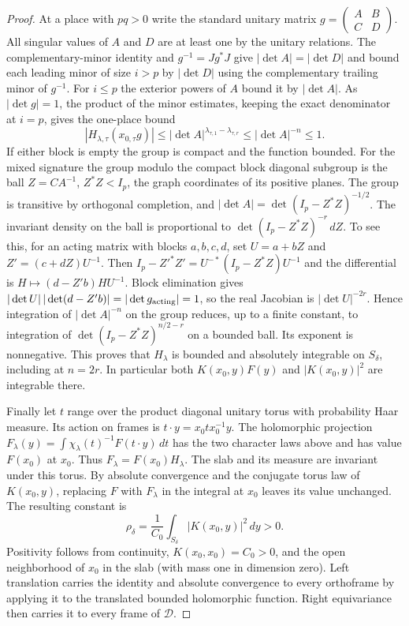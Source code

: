 \begin{proof}
At a place with $pq>0$ write the standard unitary matrix
$g=\left(\begin{smallmatrix}A&B\\ C&D\end{smallmatrix}\right)$.
All singular values of $A$ and $D$ are at least one by the unitary
relations. The complementary-minor identity and $g^{-1}=Jg^*J$
give $|\det A|=|\det D|$ and bound each leading minor of size
$i>p$ by $|\det D|$ using the complementary trailing minor of
$g^{-1}$. For $i\le p$ the exterior powers of $A$ bound it by
$|\det A|$. As $|\det g|=1$, the product of the minor estimates,
keeping the exact denominator at $i=p$, gives the one-place bound
\[
       |H_{\lambda,\tau}(x_{0,\tau}g)|
          \le |\det A|^{\lambda_{\tau,1}-\lambda_{\tau,r}}
          \le |\det A|^{-n}\le1 .
\]
If either block is empty the group is compact and the function bounded.
For the mixed signature the group modulo the compact block diagonal
subgroup is the ball $Z=C A^{-1}$, $Z^*Z<I_p$, the graph coordinates
of its positive planes. The group is transitive by orthogonal
completion, and $|\det A|=\det(I_p-Z^*Z)^{-1/2}$.
The invariant density on the ball is proportional to
$\det(I_p-Z^*Z)^{-r}\,dZ$. To see this, for an acting matrix with
blocks $a,b,c,d$, set $U=a+bZ$ and $Z'=(c+dZ)U^{-1}$.
Then $I_p-Z'^*Z'=U^{-*}(I_p-Z^*Z)U^{-1}$ and the differential is
$H\mapsto(d-Z'b)HU^{-1}$. Block elimination gives
$|\det U|\,|\det(d-Z'b)|=|\det g_{\rm acting}|=1$, so the real
Jacobian is $|\det U|^{-2r}$. Hence integration of $|\det A|^{-n}$
on the group reduces, up to a finite constant, to integration of
$\det(I_p-Z^*Z)^{n/2-r}$ on a bounded ball. Its exponent is
nonnegative. This proves that $H_\lambda$ is bounded and absolutely
integrable on $S_\delta$, including at $n=2r$. In particular both
$K(x_0,y)F(y)$ and $|K(x_0,y)|^2$ are integrable there.

Finally let $t$ range over the product diagonal unitary torus with
probability Haar measure. Its action on frames is
$t\cdot y=x_0 t x_0^{-1}y$. The holomorphic projection
$F_\lambda(y)=\int\chi_\lambda(t)^{-1}F(t\cdot y)\,dt$ has the two
character laws above and has value $F(x_0)$ at $x_0$. Thus
$F_\lambda=F(x_0)H_\lambda$. The slab and its measure are invariant
under this torus. By absolute convergence and the conjugate torus
law of $K(x_0,y)$, replacing $F$ with $F_\lambda$ in the integral
at $x_0$ leaves its value unchanged. The resulting constant is
\[
                \rho_\delta=\frac{1}{C_0}
                   \int_{S_\delta}|K(x_0,y)|^2\,dy>0 .
\]
Positivity follows from continuity, $K(x_0,x_0)=C_0>0$, and the
open neighborhood of $x_0$ in the slab (with mass one in dimension
zero). Left translation carries the identity and absolute convergence
to every orthoframe by applying it to the translated bounded
holomorphic function. Right equivariance then carries it to every
frame of $\mathcal D$.
\end{proof}

